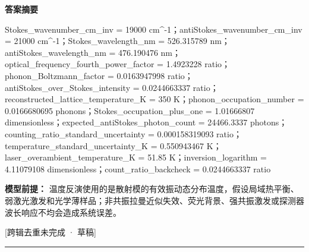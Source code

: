 \documentclass[UTF8,11pt,a4paper]{ctexart}
\begin{document}
\noindent\textbf{答案摘要}\par
Stokes\_wavenumber\_cm\_inv = 19000 cm\textasciicircum{}-1；antiStokes\_wavenumber\_cm\_inv = 21000 cm\textasciicircum{}-1；Stokes\_wavelength\_nm = 526.315789 nm；antiStokes\_wavelength\_nm = 476.190476 nm；optical\_frequency\_fourth\_power\_factor = 1.4923228 ratio；phonon\_Boltzmann\_factor = 0.0163947998 ratio；antiStokes\_over\_Stokes\_intensity = 0.0244663337 ratio；reconstructed\_lattice\_temperature\_K = 350 K；phonon\_occupation\_number = 0.0166680695 phonons；Stokes\_occupation\_plus\_one = 1.01666807 dimensionless；expected\_antiStokes\_photon\_count = 24466.3337 photons；counting\_ratio\_standard\_uncertainty = 0.000158319093 ratio；temperature\_standard\_uncertainty\_K = 0.550943467 K；laser\_overambient\_temperature\_K = 51.85 K；inversion\_logarithm = 4.11079108 dimensionless；count\_ratio\_backcheck = 0.0244663337 ratio\par
\noindent\textbf{模型前提：}
温度反演使用的是散射模的有效振动态分布温度，假设局域热平衡、弱激光激发和光学薄样品；非共振拉曼近似失效、荧光背景、强共振激发或探测器波长响应不均会造成系统误差。\par
\noindent\textcolor{red!65!black}{[跨辑去重未完成 · 草稿]} \par
\medskip\hrule\medskip
{}
\end{document}
